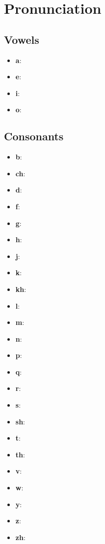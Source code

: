 \chapter*{Pronunciation}
\section*{Vowels}
\begin{itemize}
	\item \textbf{a}:
	\item \textbf{e}:
	\item \textbf{i}:
	\item \textbf{o}:
\end{itemize}
\section*{Consonants}
\begin{itemize}
	\item \textbf{b}:
	\item \textbf{ch}:
	\item \textbf{d}:
	\item \textbf{f}:
	\item \textbf{g}:
	\item \textbf{h}:
	\item \textbf{j}:
	\item \textbf{k}:
	\item \textbf{kh}:
	\item \textbf{l}:
	\item \textbf{m}:
	\item \textbf{n}:
	\item \textbf{p}:
	\item \textbf{q}:
	\item \textbf{r}:
	\item \textbf{s}:
	\item \textbf{sh}:
	\item \textbf{t}:
	\item \textbf{th}:
	\item \textbf{v}:
	\item \textbf{w}:
	\item \textbf{y}:
	\item \textbf{z}:
	\item \textbf{zh}:
\end{itemize}
